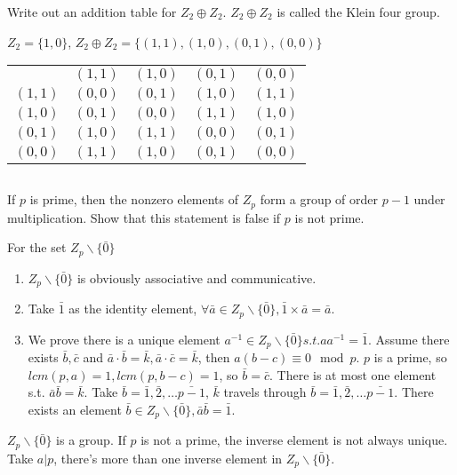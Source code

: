 $$ $$

\begin{ex}
    Write out an addition table for $Z_2\oplus Z_2$. $Z_2\oplus Z_2$ is called the Klein four group.
\end{ex}

\begin{answer}
    $Z_2=\{1,0\}$, $Z_2\oplus Z_2=\{(1,1), (1,0), (0,1), (0,0)\}$
    \begin{table}[H]
        \centering
        \begin{tabular}{c|cccc}
            \multicolumn{1}{c}{} & $(1,1)$ & $(1,0)$ & $(0,1)$ & $(0,0)$\\
            \cline{2-5}
            $(1,1)$ & $(0,0)$ & $(0,1)$ & $(1,0)$ & $(1,1)$ \\
            $(1,0)$ &$(0,1)$  & $(0,0)$ & $(1,1)$ & $(1,0)$ \\
            $(0,1)$ & $(1,0)$ & $(1,1)$ & $(0,0)$ & $(0,1)$ \\
            $(0,0)$ & $(1,1)$ & $(1,0)$ & $(0,1)$ & $(0,0)$
        \end{tabular}
    \end{table}
\end{answer}

$$ $$

\begin{ex}
    If $p$ is prime, then the nonzero elements of $Z_p$ form a group of order $p - 1$ under multiplication. Show that this statement is false if $p$ is not prime.
\end{ex}

\begin{answer}
    For the set $Z_p\backslash\{\bar{0}\}$
    \begin{enumerate}
        \item $Z_p\backslash\{\bar{0}\}$ is obviously associative and communicative.
        \item Take $\bar{1}$ as the identity element, $\forall \bar{a}\in Z_p\backslash\{\bar{0}\}, \bar{1}\times \bar{a}=\bar{a}$.
        \item We prove there is a unique element $a^{-1}\in Z_p\backslash\{\bar{0}\} s.t. aa^{-1}=\bar{1} $. Assume there exists $\bar{b},\bar{c}$ and $\bar{a}\cdot\bar{b}=\bar{k},\bar{a}\cdot\bar{c}=\bar{k}$, then $a(b-c)\equiv 0\mod{p}$. $p$ is a prime, so $lcm(p,a)=1,  lcm(p,b-c)=1$, so $\bar{b}=\bar{c}$. There is at most one element s.t. $\bar{a}\bar{b}=\bar{k}$. Take $\bar{b}=\bar{1}, \bar{2},\dots\bar{p-1}$, $\bar{k}$ travels through $\bar{b}=\bar{1}, \bar{2},\dots\bar{p-1}$. There exists an element $\bar{b}\in Z_p\backslash\{\bar{0}\}, \bar{a}\bar{b}=\bar{1}$.
    \end{enumerate}
    $Z_p\backslash\{\bar{0}\}$ is a group. If $p$ is not a prime, the inverse element is not always unique. Take $a|p$, there's more than one inverse element in $Z_p\backslash\{\bar{0}\}$.
\end{answer}

